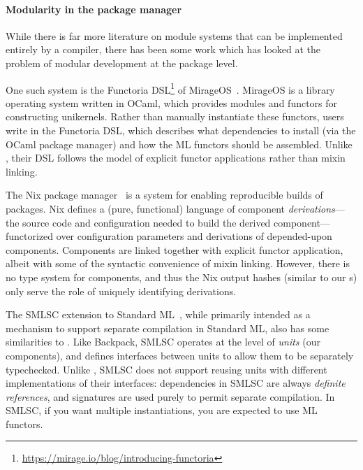 \paragraph{Modularity in the package manager}  While there is far more
literature on module systems that can be implemented entirely by a
compiler, there has been some work which has looked at the problem of
modular development at the package level.

One such system
is the Functoria DSL\footnote{\smaller \url{https://mirage.io/blog/introducing-functoria}}
of MirageOS~\cite{mirageos}.  MirageOS is a library operating system
written in OCaml, which provides modules and functors for constructing
unikernels.  Rather than manually instantiate these functors,
users write in the Functoria DSL, which describes what
dependencies to install (via the OCaml package manager) and how the ML
functors should be assembled.  Unlike \Backpack{}, their DSL follows
the model of explicit functor applications rather than mixin linking.

The Nix package manager~\cite{dolstra:thesis} is a
system for enabling reproducible builds of packages. Nix defines a (pure, functional) language of component
\emph{derivations}---\ie{} the source code and configuration
needed to build the derived component---%
functorized over configuration parameters and derivations of
depended-upon components.  Components are linked together with explicit
functor application, albeit with some of the syntactic convenience of
mixin linking.  However, there is no type system for components,
and thus the Nix output hashes (similar to our \cid{}s) only serve
the role of uniquely identifying derivations.

The SMLSC extension to Standard ML~\cite{swasey+:smlsc}, while
primarily intended as a mechanism to support separate compilation in
Standard ML, also has some similarities to \Backpack{}.  Like
Backpack, SMLSC operates at the level of \emph{units} (our
components), and defines interfaces between units to allow them to be
separately typechecked.  Unlike \Backpack{}, SMLSC does not support
reusing units with different
implementations of their interfaces: dependencies in SMLSC are always
\emph{definite references}, and signatures are used purely to permit
separate compilation.  In SMLSC, if you want multiple instantiations,
you are expected to use ML functors.

